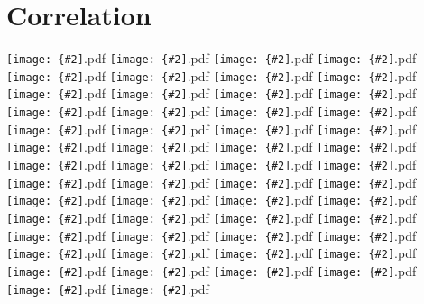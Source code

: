 \documentclass[12pt,a4paper]{article}
\newcommand{\pdffig}[2][0.5]{\texttt{[image: \{\#2]}.pdf}}
\begin{document}
\section{Correlation}
\pdffig[0.5]{Correlation_Aus_tsfc_u_hig}
\pdffig[0.5]{Correlation_Aus_tsfc_u_low}
\pdffig[0.5]{Correlation_Aus_tsfc_v_high}
\pdffig[0.5]{Correlation_Aus_tsfc_v_low}
\pdffig[0.5]{Correlation_Aus_tsfc_w_high}
\pdffig[0.5]{Correlation_Aus_tsfc_w_low}
\pdffig[0.5]{Correlation_India_tsfc_u_hig}
\pdffig[0.5]{Correlation_India_tsfc_u_low}
\pdffig[0.5]{Correlation_India_tsfc_v_high}
\pdffig[0.5]{Correlation_India_tsfc_v_low}
\pdffig[0.5]{Correlation_India_tsfc_w_high}
\pdffig[0.5]{Correlation_India_tsfc_w_low}
\pdffig[0.5]{Correlation_MC_tsfc_u_hig}
\pdffig[0.5]{Correlation_MC_tsfc_u_low}
\pdffig[0.5]{Correlation_MC_tsfc_v_high}
\pdffig[0.5]{Correlation_MC_tsfc_v_low}
\pdffig[0.5]{Correlation_MC_tsfc_w_high}
\pdffig[0.5]{Correlation_MC_tsfc_w_low}
\pdffig[0.5]{Correlation_NthEastAfr_tsfc_u_hig}
\pdffig[0.5]{Correlation_NthEastAfr_tsfc_u_low}
\pdffig[0.5]{Correlation_NthEastAfr_tsfc_v_high}
\pdffig[0.5]{Correlation_NthEastAfr_tsfc_v_low}
\pdffig[0.5]{Correlation_NthEastAfr_tsfc_w_high}
\pdffig[0.5]{Correlation_NthEastAfr_tsfc_w_low}
\pdffig[0.5]{Correlation_NthWestAfr_tsfc_u_hig}
\pdffig[0.5]{Correlation_NthWestAfr_tsfc_u_low}
\pdffig[0.5]{Correlation_NthWestAfr_tsfc_v_high}
\pdffig[0.5]{Correlation_NthWestAfr_tsfc_v_low}
\pdffig[0.5]{Correlation_NthWestAfr_tsfc_w_high}
\pdffig[0.5]{Correlation_NthWestAfr_tsfc_w_low}
\pdffig[0.5]{Correlation_SthAfr_tsfc_u_hig}
\pdffig[0.5]{Correlation_SthAfr_tsfc_u_low}
\pdffig[0.5]{Correlation_SthAfr_tsfc_v_high}
\pdffig[0.5]{Correlation_SthAfr_tsfc_v_low}
\pdffig[0.5]{Correlation_SthAfr_tsfc_w_high}
\pdffig[0.5]{Correlation_SthAfr_tsfc_w_low}
\pdffig[0.5]{Correlation_SthSthAm_tsfc_u_hig}
\pdffig[0.5]{Correlation_SthSthAm_tsfc_u_low}
\pdffig[0.5]{Correlation_SthSthAm_tsfc_v_high}
\pdffig[0.5]{Correlation_SthSthAm_tsfc_v_low}
\pdffig[0.5]{Correlation_SthSthAm_tsfc_w_high}
\pdffig[0.5]{Correlation_SthSthAm_tsfc_w_low}
\pdffig[0.5]{Correlation_TropAfr_tsfc_u_hig}
\pdffig[0.5]{Correlation_TropAfr_tsfc_u_low}
\pdffig[0.5]{Correlation_TropAfr_tsfc_v_high}
\pdffig[0.5]{Correlation_TropAfr_tsfc_v_low}
\pdffig[0.5]{Correlation_TropAfr_tsfc_w_high}
\pdffig[0.5]{Correlation_TropAfr_tsfc_w_low}
\pdffig[0.5]{Correlation_TropSthAm_tsfc_u_hig}
\pdffig[0.5]{Correlation_TropSthAm_tsfc_u_low}
\pdffig[0.5]{Correlation_TropSthAm_tsfc_v_high}
\pdffig[0.5]{Correlation_TropSthAm_tsfc_v_low}
\pdffig[0.5]{Correlation_TropSthAm_tsfc_w_high}
\pdffig[0.5]{Correlation_TropSthAm_tsfc_w_low}
\end{document}
